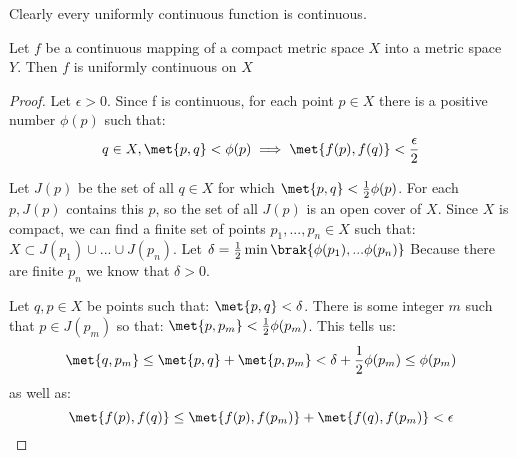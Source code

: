 \documentclass[12pt, letterpaper]{paper}
\begin{document}
Clearly every uniformly continuous function is continuous.

\begin{theorem}
  \label{thr:4.19}
  Let $f$ be a continuous mapping of a compact metric space $X$ into a
  metric space $Y$. Then $f$ is uniformly continuous on $X$
  \begin{proof}
    Let $\epsilon > 0$. Since f is continuous, for each point
    $p \in X$ there is a positive number $\phi(p)$ such that:
    \begin{equation*}
      q \in X, \met{p,q} < \phi(p) \implies \met{f(p), f(q)} < \frac{\epsilon}{2}
    \end{equation*}

    Let $J(p)$ be the set of all $q \in X$ for which
    $\met{p,q} < \frac{1}{2} \phi(p)$. For each $p, J(p)$ contains this
    $p$, so the set of all $J(p)$ is an open cover of $X$. Since $X$
    is compact, we can find a finite set of points
    $p_1, ..., p_n \in X$ such that:
    $X \subset J(p_1) \cup ... \cup J(p_n)$. Let
    $\delta = \frac{1}{2} \min \brak{ \phi(p_1), ... \phi(p_n)}$ Because there
    are finite $p_n$ we know that $\delta > 0$.

    Let $q,p \in X$ be points such that: $\met{p,q} < \delta$. There is some
    integer $m$ such that $p \in J(p_m)$ so that:
    $\met{p,p_m} < \frac{1}{2}\phi(p_m)$. This tells us:
    \begin{equation*}
      \met{q,p_m} \leq \met{p,q} + \met{p,p_m} < \delta + \frac{1}{2}\phi(p_m) \leq \phi(p_m)
    \end{equation*}
    as well as:
    \begin{equation*}
      \met{f(p),f(q)} \leq \met{f(p),f(p_m)} + \met{f(q), f(p_m)} < \epsilon
    \end{equation*}
  \end{proof}
\end{theorem}
\end{document}
